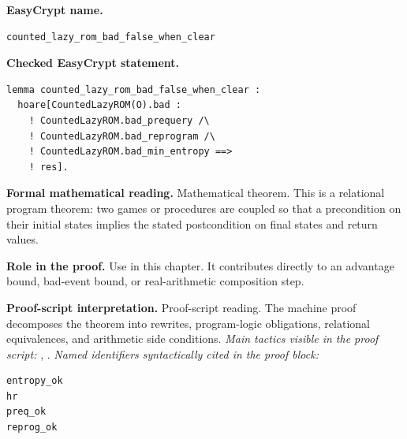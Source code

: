 \begin{formaltheorem}
\noindent\textbf{EasyCrypt name.}
\begin{lstlisting}[language=EasyCrypt,basicstyle=\ttfamily\scriptsize]
counted_lazy_rom_bad_false_when_clear
\end{lstlisting}
\noindent\textbf{Checked EasyCrypt statement.}
\begin{lstlisting}[language=EasyCrypt,basicstyle=\ttfamily\scriptsize]
lemma counted_lazy_rom_bad_false_when_clear :
  hoare[CountedLazyROM(O).bad :
    ! CountedLazyROM.bad_prequery /\
    ! CountedLazyROM.bad_reprogram /\
    ! CountedLazyROM.bad_min_entropy ==>
    ! res].
\end{lstlisting}
\noindent\textbf{Formal mathematical reading.}
Mathematical theorem. This is a relational program theorem: two games or procedures are coupled so that a precondition on their initial states implies the stated postcondition on final states and return values.

\noindent\textbf{Role in the proof.}
Use in this chapter. It contributes directly to an advantage bound, bad-event bound, or real-arithmetic composition step.

\noindent\textbf{Proof-script interpretation.}
Proof-script reading. The machine proof decomposes the theorem into rewrites, program-logic obligations, relational equivalences, and arithmetic side conditions.
\emph{Main tactics visible in the proof script:} , .
\emph{Named identifiers syntactically cited in the proof block:}
\begin{lstlisting}[language=EasyCrypt,basicstyle=\ttfamily\scriptsize]
entropy_ok
hr
preq_ok
reprog_ok
\end{lstlisting}

\end{formaltheorem}

